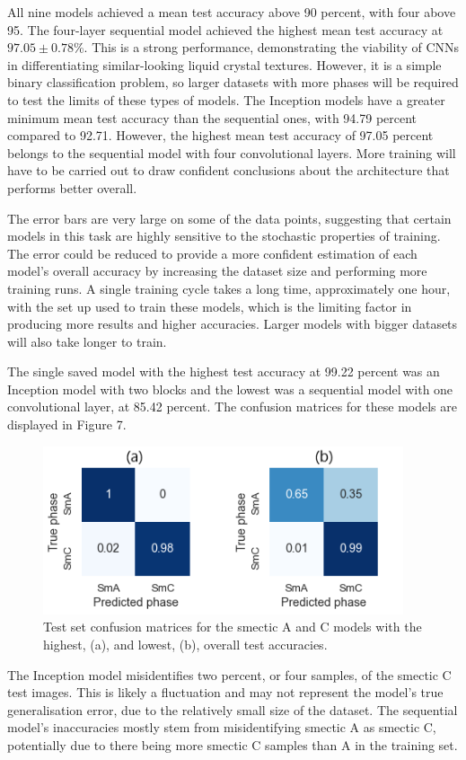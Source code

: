 \documentclass[12pt]{article}
\begin{document}
All nine models achieved a mean test accuracy above 90 percent, with four above 95. The four-layer sequential model achieved the highest mean test accuracy at $97.05\pm0.78$\%. This is a strong performance, demonstrating the viability of CNNs in differentiating similar-looking liquid crystal textures. However, it is a simple binary classification problem, so larger datasets with more phases will be required to test the limits of these types of models. The Inception models have a greater minimum mean test accuracy than the sequential ones, with 94.79 percent compared to 92.71. However, the highest mean test accuracy of 97.05 percent belongs to the sequential model with four convolutional layers. More training will have to be carried out to draw confident conclusions about the architecture that performs better overall.

The error bars are very large on some of the data points, suggesting that certain models in this task are highly sensitive to the stochastic properties of training. The error could be reduced to provide a more confident estimation of each model's overall accuracy by increasing the dataset size and performing more training runs. A single training cycle takes a long time, approximately one hour, with the set up used to train these models, which is the limiting factor in producing more results and higher accuracies. Larger models with bigger datasets will also take longer to train.

The single saved model with the highest test accuracy at 99.22 percent was an Inception model with two blocks and the lowest was a sequential model with one convolutional layer, at 85.42 percent. The confusion matrices for these models are displayed in Figure 7.
\begin{figure}[!ht]
	\centering
    \includegraphics[width=4.174in]{images/confusion_matrix_2.png}
    \caption{Test set confusion matrices for the smectic A and C models with the highest, (a), and lowest, (b), overall test accuracies.}
\end{figure} 
The Inception model misidentifies two percent, or four samples, of the smectic C test images. This is likely a fluctuation and may not represent the model's true generalisation error, due to the relatively small size of the dataset. The sequential model's inaccuracies mostly stem from misidentifying smectic A as smectic C, potentially due to there being more smectic C samples than A in the training set. 
\end{document}

